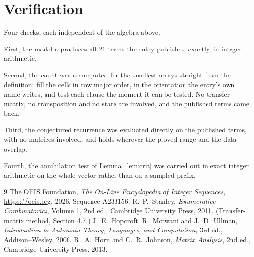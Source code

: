 \documentclass[11pt,a4paper]{article}
\theoremstyle{plain}
\theoremstyle{definition}
\begin{document}
\section{Verification}

Four checks, each independent of the algebra above.

First, the model reproduces all $21$ terms the entry publishes, exactly, in integer
arithmetic.

Second, the count was recomputed for the smallest arrays straight from the definition: fill the
cells in row major order, in the orientation the entry's own name writes, and test each clause
the moment it can be tested. No transfer matrix, no transposition and no state are involved,
and the published terms came back.

Third, the conjectured recurrence was evaluated directly on the published terms, with no
matrices involved, and holds wherever the proved range and the data overlap.

Fourth, the annihilation test of Lemma~\ref{lem:crit} was carried out in exact integer
arithmetic on the whole vector rather than on a sampled prefix.

\begin{thebibliography}{9}
 The OEIS Foundation, \emph{The On-Line Encyclopedia of Integer
Sequences}, \url{https://oeis.org}, 2026. Sequence A233156.
 R.~P.~Stanley, \emph{Enumerative Combinatorics}, Volume 1, 2nd ed.,
Cambridge University Press, 2011. (Transfer-matrix method, Section 4.7.)
 J.~E.~Hopcroft, R.~Motwani and J.~D.~Ullman, \emph{Introduction to Automata
Theory, Languages, and Computation}, 3rd ed., Addison--Wesley, 2006.
 R.~A.~Horn and C.~R.~Johnson, \emph{Matrix Analysis}, 2nd ed., Cambridge
University Press, 2013.
\end{thebibliography}
\end{document}
